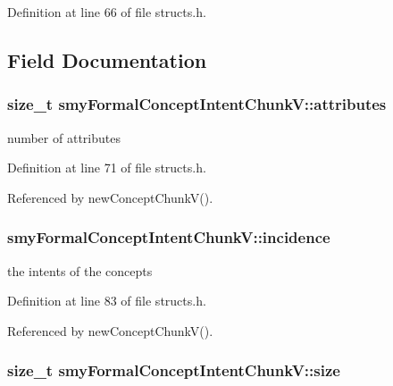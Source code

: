 \-Definition at line 66 of file structs.\-h.



\subsection{\-Field \-Documentation}
\hypertarget{structsmyFormalConceptIntentChunkV_ab40281b9f96435442255be08563782c0}{
\subsubsection[{attributes}]{\setlength{\rightskip}{0pt plus 5cm}size\-\_\-t {\bf smy\-Formal\-Concept\-Intent\-Chunk\-V\-::attributes}}}\label{structsmyFormalConceptIntentChunkV_ab40281b9f96435442255be08563782c0}


number of attributes 



\-Definition at line 71 of file structs.\-h.



\-Referenced by new\-Concept\-Chunk\-V().

\hypertarget{structsmyFormalConceptIntentChunkV_a12a126936dbafdf7ec85de7fed74eb8c}{
\subsubsection[{incidence}]{ {\bf smy\-Formal\-Concept\-Intent\-Chunk\-V\-::incidence}}}\label{structsmyFormalConceptIntentChunkV_a12a126936dbafdf7ec85de7fed74eb8c}


the intents of the concepts 



\-Definition at line 83 of file structs.\-h.



\-Referenced by new\-Concept\-Chunk\-V().

\hypertarget{structsmyFormalConceptIntentChunkV_acbb0ea8f58b4a13ecefc5a996c386206}{
\subsubsection[{size}]{\setlength{\rightskip}{0pt plus 5cm}size\-\_\-t {\bf smy\-Formal\-Concept\-Intent\-Chunk\-V\-::size}}}\label{structsmyFormalConceptIntentChunkV_acbb0ea8f58b4a13ecefc5a996c386206}


